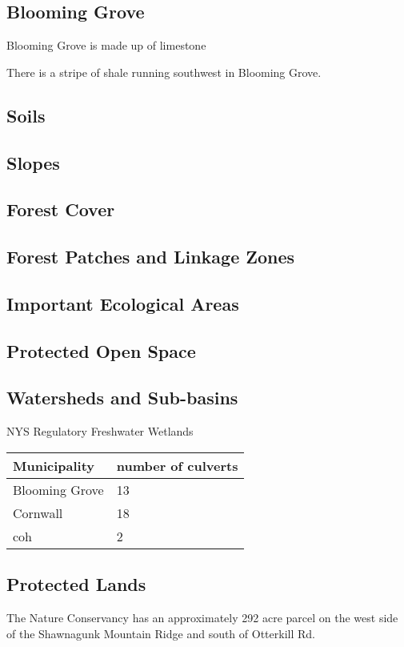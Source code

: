 \subsection{Blooming Grove}
Blooming Grove is made up of 
limestone

There is a stripe of shale running southwest in Blooming Grove. 

\subsection{Soils}
\subsection{Slopes}


\subsection{Forest Cover}

\subsection{Forest Patches and Linkage Zones}
\subsection{Important Ecological Areas}
\subsection{Protected Open Space}
\subsection{Watersheds and Sub-basins}

NYS Regulatory Freshwater Wetlands
\begin{table}
\begin{tabular}{p{7cm} p{7cm}}
\label{tab:culverts}
Municipality & number of culverts \\
\hline
Blooming Grove & 13\\
Cornwall & 18\\
\acrlong{coh} & 2\\
\end{tabular}
\end{table}

\subsection{Protected Lands}
The Nature Conservancy has an approximately 292 acre parcel on the west side of the Shawnagunk Mountain Ridge and south of Otterkill Rd.